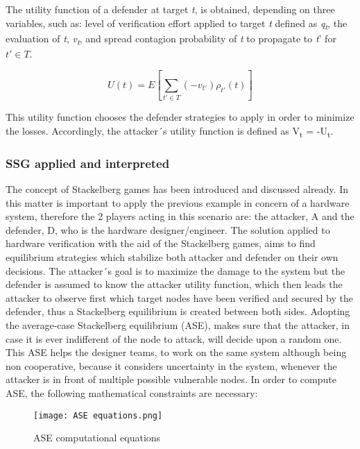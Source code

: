 \documentclass[conference]{IEEEtran}
\begin{document}
The utility function of a defender at target \textit{t}, is obtained, depending on three variables, such as: level of verification effort applied to target \textit{t} defined as \textit{q\textsubscript{t}}, the evaluation of \textit{t}, \textit{v\textsubscript{t}}, and spread contagion probability of \textit{t} to propagate to \textit{t}' for $\textit{t}' \in T$.

\begin{displaymath}
U(t) = E[\sum_{t'\in T}(-v_{t'})\rho_{t'}(t)]
\end{displaymath}


This utility function chooses the defender strategies to apply in order to minimize the losses. Accordingly, the attacker´s utility function is defined as V\textsubscript{t} = -U\textsubscript{t}.

\subsubsection{SSG applied and interpreted}
The concept of Stackelberg games has been introduced and discussed already. In this matter is important to apply the previous example in concern of a hardware system, therefore the 2 players acting in this scenario are: the attacker, A and the defender, D, who is the hardware designer/engineer.
The solution applied to hardware verification with the aid of the Stackelberg games, aims to find equilibrium strategies which stabilize both attacker and defender on their own decisions. The attacker´s goal is to maximize the damage to the system but the defender is assumed to know the attacker utility function, which then leads the attacker to observe first which target nodes have been verified and secured by the defender, thus a Stackelberg equilibrium is created between both sides. Adopting the average-case Stackelberg equilibrium (ASE), makes sure that the attacker, in case it is ever indifferent of the node to attack, will decide upon a random one. This ASE helps the designer teams, to work on the same system although being non cooperative, because it considers uncertainty in the system, whenever the attacker is in front of multiple possible vulnerable nodes.
In order to compute ASE, the following mathematical constraints are necessary:
\begin{figure}[h]
    \centerline{\texttt{[image: ASE equations.png]}}
    \caption{ASE computational equations}
    \label{ase}
\end{figure} 
\end{document}
